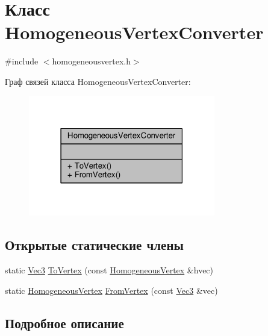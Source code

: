 \hypertarget{class_homogeneous_vertex_converter}{}\section{Класс Homogeneous\+Vertex\+Converter}
\label{class_homogeneous_vertex_converter}


{\ttfamily \#include $<$homogeneousvertex.\+h$>$}



Граф связей класса Homogeneous\+Vertex\+Converter\+:
\nopagebreak
\begin{figure}[H]
\begin{center}
\leavevmode
\includegraphics[width=231pt]{d9/d45/class_homogeneous_vertex_converter__coll__graph}
\end{center}
\end{figure}
\subsection*{Открытые статические члены}
\begin{DoxyCompactItemize}
\item 
static \hyperlink{vec3_8h_a221ad8ea4d9be4111628ee1ca22ee3ba}{Vec3} \hyperlink{class_homogeneous_vertex_converter_a5ee9db87aeed48aec688c3ce53ae4e4c}{To\+Vertex} (const \hyperlink{homogeneousvertex_8h_ac57a7e4c1ca5e8ae47858d4ae8e7120d}{Homogeneous\+Vertex} \&hvec)
\item 
static \hyperlink{homogeneousvertex_8h_ac57a7e4c1ca5e8ae47858d4ae8e7120d}{Homogeneous\+Vertex} \hyperlink{class_homogeneous_vertex_converter_a2e43c599f3a88f27316d098548430978}{From\+Vertex} (const \hyperlink{vec3_8h_a221ad8ea4d9be4111628ee1ca22ee3ba}{Vec3} \&vec)
\end{DoxyCompactItemize}


\subsection{Подробное описание}


